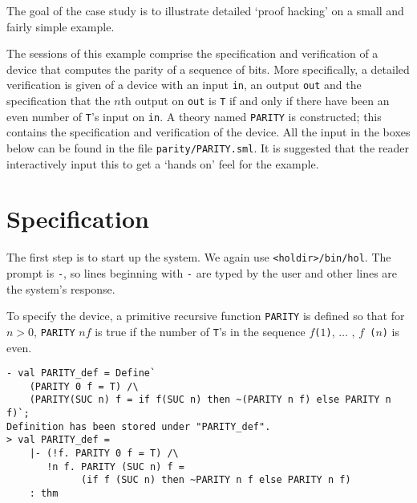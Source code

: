 The goal of the case study is to illustrate detailed `proof hacking'
on a small and fairly simple example.

The sessions of this example comprise the specification and
verification of a device that computes the parity of a sequence of
bits.  More specifically, a detailed verification is given of a device
with an input {\small\verb|in|}, an output {\small\verb|out|} and the
specification that the $n$th output on {\small\verb|out|} is
{\small\verb|T|} if and only if there have been an even number of
{\small\verb|T|}'s input on {\small\verb|in|}. A theory named
{\small\verb|PARITY|} is constructed; this contains the specification
and verification of the device. All the \ML{} input in the boxes below
can be found in the file {\small\verb|parity/PARITY.sml|}. It is
suggested that the reader interactively input this to get a `hands on'
feel for the example.


\section{Specification}
\label{example}
The first step is to start up the \HOL{} system.  We again use
\texttt{<holdir>/bin/hol}.  The \ML{} prompt is {\small\verb|-|}, so
lines beginning with {\small\verb|-|} are typed by the user and other
lines are the system's response.

To specify the device, a primitive recursive function
{\small\verb|PARITY|} is defined so that for $n>0$, {\small\tt PARITY}
$n f$ is true if the number of {\small\verb|T|}'s in the sequence
$f${\small\tt (}$1${\small\tt)}, $\ldots$ , $f${\small\tt
  (}$n${\small\tt)} is even.

\setcounter{sessioncount}{0}
\begin{session}
\begin{verbatim}
- val PARITY_def = Define`
    (PARITY 0 f = T) /\
    (PARITY(SUC n) f = if f(SUC n) then ~(PARITY n f) else PARITY n f)`;
Definition has been stored under "PARITY_def".
> val PARITY_def =
    |- (!f. PARITY 0 f = T) /\
       !n f. PARITY (SUC n) f =
             (if f (SUC n) then ~PARITY n f else PARITY n f)
    : thm
\end{verbatim}
\end{session}

\noindent


